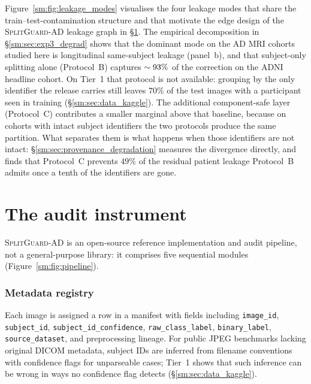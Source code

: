 \documentclass[11pt]{article}
\newcommand{\SGA}{\textsc{SplitGuard-AD}}
\begin{document}
Figure~\ref{sm:fig:leakage_modes} visualises the four leakage modes that
share the train--test-contamination structure and that motivate the
edge design of the \SGA{} leakage graph in \S\ref{sm:sec:method}. The
empirical decomposition in \S\ref{sm:sec:exp3_degrad} shows that the
dominant mode on the AD MRI cohorts studied here is longitudinal
same-subject leakage (panel~b), and that subject-only splitting
alone (Protocol~B) captures $\sim 93\%$ of the correction on the
ADNI headline cohort. On Tier~1 that protocol is not available:
grouping by the only identifier the release carries still leaves
$70\%$ of the test images with a participant seen in training
(\S\ref{sm:sec:data_kaggle}). The additional component-safe layer (Protocol~C) contributes
a smaller marginal above that baseline, because on cohorts with intact
subject identifiers the two protocols produce the same partition. What
separates them is what happens when those identifiers are not intact:
\S\ref{sm:sec:provenance_degradation} measures the divergence directly,
and finds that Protocol~C prevents $49\%$ of the residual patient
leakage Protocol~B admits once a tenth of the identifiers are gone.



\section{The audit instrument}
\label{sm:sec:method}

\SGA{} is an open-source reference implementation and audit pipeline, not a general-purpose library: it comprises five sequential
modules (Figure~\ref{sm:fig:pipeline}).



\subsubsection{Metadata registry}
Each image is assigned a row in a manifest with fields including
\texttt{image\_id}, \texttt{subject\_id}, \texttt{subject\_id\_confidence},
\texttt{raw\_class\_label}, \texttt{binary\_label},
\texttt{source\_dataset}, and preprocessing lineage.
For public JPEG benchmarks lacking original DICOM metadata, subject IDs
are inferred from filename conventions with confidence flags for
unparseable cases; Tier~1 shows that such inference can be wrong in
ways no confidence flag detects (\S\ref{sm:sec:data_kaggle}).
\end{document}

